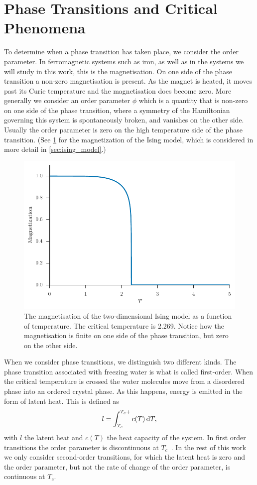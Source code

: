 \documentclass[11pt, a4paper]{report} %
\begin{document}
\section{Phase Transitions and Critical Phenomena}
To determine when a phase transition has taken place, we consider the order parameter.
In ferromagnetic systems such as iron, as well as in the systems we will study in this work, this is the magnetisation.
On one side of the phase transition a non-zero magnetisation is present.
As the magnet is heated, it moves past its Curie temperature and the magnetisation does become zero.
More generally we consider an order parameter \(\phi\) which is a quantity that is non-zero on one side of the phase transition, where a symmetry of the Hamiltonian governing this system is spontaneously broken, and vanishes on the other side. Usually the order parameter is zero on the high temperature side of the phase transition. (See \cref{fig:ising_magnetization} for the magnetization of the Ising model, which is considered in more detail in \cref{sec:ising_model}.)


\begin{figure}[htb]
	\centering
	\includegraphics[width=0.85\linewidth]{ising_magnetization}
	\caption{The magnetisation of the two-dimensional Ising model as a function of temperature. The critical temperature is 2.269. Notice how the magnetisation is finite on one side of the phase transition, but zero on the other side.}
	\label{fig:ising_magnetization}
\end{figure}

When we consider phase transitions, we distinguish two different kinds.
The phase transition associated with freezing water is what is called first-order.
When the critical temperature is crossed the water molecules move from a disordered phase into an ordered crystal phase.
As this happens, energy is emitted in the form of latent heat.
This is defined as
\begin{equation}
	\label{eq:latent_heat}
	l = \int_{T_c-}^{T_c+} c(T) \dif T,
\end{equation}
with \(l\) the latent heat and \(c(T)\) the heat capacity of the system.
In first order transitions the order parameter is discontinuous at \(T_c\)~\cite{binney:1992}.
In the rest of this work we only consider second-order transitions, for which the latent heat is zero and the order parameter, but not the rate of change of the order parameter, is continuous at \(T_c\).
\end{document}
